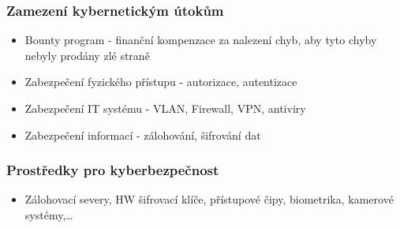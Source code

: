 \subsubsection*{Zamezení kybernetickým útokům}
\begin{itemize}
  \item Bounty program - finanční kompenzace za nalezení chyb, aby tyto chyby nebyly prodány zlé straně
  \item Zabezpečení fyzického přístupu - autorizace, autentizace
  \item Zabezpečení IT systému - VLAN, Firewall, VPN, antiviry
  \item Zabezpečení informací - zálohování, šifrování dat
\end{itemize}

\subsubsection*{Prostředky pro kyberbezpečnost}
\begin{itemize}
  \item Zálohovací severy, HW šifrovací klíče, přístupové čipy, biometrika, kamerové systémy,\dots
\end{itemize}